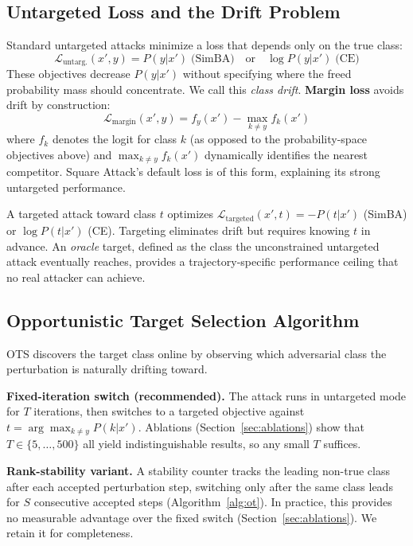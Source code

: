 \documentclass{cap2026}
\begin{document}
\subsection{Untargeted Loss and the Drift Problem}\label{sec:drift}

Standard untargeted attacks minimize a loss that depends only on the true class:
\begin{equation}
\mathcal{L}_{\text{untarg.}}(x', y) = P(y | x') \;\text{(SimBA)} \quad \text{or} \quad \log P(y | x') \;\text{(CE)}
\end{equation}
These objectives decrease $P(y|x')$ without specifying where the freed probability mass should concentrate. We call this \textit{class drift}. \textbf{Margin loss} avoids drift by construction:
\begin{equation}
\mathcal{L}_{\text{margin}}(x', y) = f_y(x') - \max_{k \neq y} f_k(x')
\end{equation}
where $f_k$ denotes the logit for class $k$ (as opposed to the probability-space objectives above) and $\max_{k \neq y} f_k(x')$ dynamically identifies the nearest competitor. Square Attack's default loss is of this form, explaining its strong untargeted performance.

A targeted attack toward class $t$ optimizes $\mathcal{L}_{\text{targeted}}(x', t) = -P(t | x')$ (SimBA) or $\log P(t | x')$ (CE). Targeting eliminates drift but requires knowing $t$ in advance. An \textit{oracle} target, defined as the class the unconstrained untargeted attack eventually reaches, provides a trajectory-specific performance ceiling that no real attacker can achieve.

\subsection{Opportunistic Target Selection Algorithm}\label{sec:algorithm}

OTS discovers the target class online by observing which adversarial class the perturbation is naturally drifting toward.

\textbf{Fixed-iteration switch (recommended).} The attack runs in untargeted mode for $T$ iterations, then switches to a targeted objective against $t = \arg\max_{k \neq y} P(k|x')$. Ablations (Section~\ref{sec:ablations}) show that $T \in \{5, \ldots, 500\}$ all yield indistinguishable results, so any small $T$ suffices.

\textbf{Rank-stability variant.} A stability counter tracks the leading non-true class after each accepted perturbation step, switching only after the same class leads for $S$ consecutive accepted steps (Algorithm~\ref{alg:ot}). In practice, this provides no measurable advantage over the fixed switch (Section~\ref{sec:ablations}). We retain it for completeness.
\end{document}
